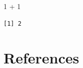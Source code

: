 \documentclass[
  letterpaper,
  DIV=11,
  numbers=noendperiod]{scrreprt}
\newenvironment{Shaded}{\begin{snugshade}}{\end{snugshade}}
\newcommand{\DecValTok}[1]{\textcolor[rgb]{0.68,0.00,0.00}{#1}}
\newcommand{\SpecialCharTok}[1]{\textcolor[rgb]{0.37,0.37,0.37}{#1}}
\newlength{\cslhangindent}
\newenvironment{CSLReferences}[2] %
 {\begin{list}{}{%
  \setlength{\itemindent}{0pt}
  \setlength{\leftmargin}{0pt}
  \setlength{\parsep}{0pt}
  \ifodd #1
   \setlength{\leftmargin}{\cslhangindent}
   \setlength{\itemindent}{-1\cslhangindent}
  \fi
  \setlength{\itemsep}{#2\baselineskip}}}
 {\end{list}}
\begin{document}
\begin{Shaded}
\begin{Highlighting}[]
\DecValTok{1} \SpecialCharTok{+} \DecValTok{1}
\end{Highlighting}
\end{Shaded}

\begin{verbatim}
[1] 2
\end{verbatim}


\chapter*{References}\label{references}


\label{refs}
\begin{CSLReferences}{0}{1}
\end{CSLReferences}



\printindex
\end{document}
